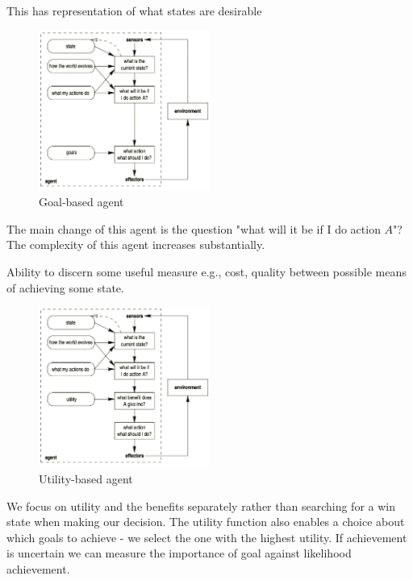 \documentclass[a4paper]{article}
\theoremstyle{plain}
\theoremstyle{definition}
\newtheorem{defn}{Definition}[section]
\theoremstyle{remark}
\begin{document}
\begin{tcolorbox}[colback=black!3!white,colframe=black!60!white,title=\begin{defn}Goal-based agents \label{Goal-based agents}\end{defn}]
This has representation of what states are desirable
\begin{figure}[H]
	\centering
	\includegraphics[width=0.5\textwidth]{6.png}
	\caption{Goal-based agent}
	\label{fig:6-png}
\end{figure}
The main change of this agent is the question "what will it be if I do action $A$"? The complexity of this agent increases substantially.
\end{tcolorbox}
\begin{tcolorbox}[colback=black!3!white,colframe=black!60!white,title=\begin{defn}Utility-based agents \label{Utility-based agents}\end{defn}]
Ability to discern some useful measure e.g., cost, quality between possible means of achieving some state. 
\begin{figure}[H]
	\centering
	\includegraphics[width=0.5\textwidth]{7.png}
	\caption{Utility-based agent}
	\label{fig:7-png}
\end{figure}
We focus on utility and the benefits separately rather than searching for a win state when making our decision. The utility function also enables a choice about which goals to achieve - we select the one with the highest utility. If achievement is uncertain we can measure the importance of goal against likelihood achievement.
\end{tcolorbox}
\end{document}
